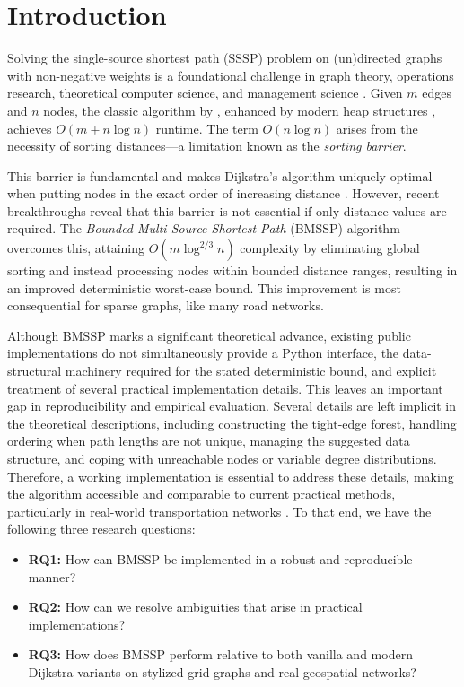 \documentclass[ijoc,blindrev]{informs3} %
\begin{document}
\section{Introduction}\label{sec:intro}
Solving the single-source shortest path (SSSP) problem on (un)directed graphs with non-negative weights is a foundational challenge in graph theory, operations research, theoretical computer science, and management science \citep{elmaghraby1970theory, orlin2010faster, duan_breaking_2025}. Given $m$ edges and $n$ nodes, the classic algorithm by \cite{dijkstra1959note}, enhanced by modern heap structures \citep{fredman1987fibonacci,chen2007priority}, achieves $O(m + n\log n)$ runtime. The term $O(n\log n)$ arises from the necessity of sorting distances—a limitation known as the \emph{sorting barrier}. 

This barrier is fundamental and makes Dijkstra’s algorithm uniquely optimal when putting nodes in the exact order of increasing distance \citep{haeupler2024universal}. However, recent breakthroughs reveal that this barrier is not essential if only distance values are required. The \emph{Bounded Multi-Source Shortest Path} (BMSSP) algorithm \citep{duan_breaking_2025} overcomes this, attaining $O(m\log^{2/3} n)$ complexity by eliminating global sorting and instead processing nodes within bounded distance ranges, resulting in an improved deterministic worst-case bound. This improvement is most consequential for sparse graphs, like many road networks.  %


Although BMSSP marks a significant theoretical advance, {\color{blue}existing public implementations do not simultaneously provide a Python interface, the data-structural machinery required for the stated deterministic bound, and explicit treatment of several practical implementation details}. {\color{blue}This leaves an important gap in reproducibility and empirical evaluation.} Several details are left implicit in the theoretical descriptions, {\color{blue}including} constructing the tight-edge forest, handling ordering when path lengths are not unique, managing the suggested data structure, and coping with unreachable nodes or variable degree distributions. Therefore, a working implementation is essential to address these details, making the algorithm accessible and comparable to current practical methods, particularly in real-world transportation networks \citep{zhan1998shortest}. To that end, we have the following three research questions:
\begin{itemize}[topsep=0pt, partopsep=0pt, itemsep=0pt, parsep=0pt]
\item \textbf{RQ1:} How can BMSSP be implemented in a robust and reproducible manner?
\item \textbf{RQ2:} How can we resolve ambiguities that arise in practical implementations?
\item \textbf{RQ3:} How does BMSSP perform relative to both vanilla and {\color{blue}modern} Dijkstra variants on stylized grid graphs and real geospatial networks?
\end{itemize}
\end{document}
